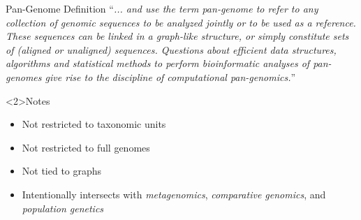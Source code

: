 \documentclass[notes=hide]{beamer}
\newcommand{\0}{\ensuremath{\mathtt{0}}}
\newcommand{\1}{\ensuremath{\mathtt{1}}}
\begin{document}
\begin{frame}{Pan-Genome Definition}
``\textit{... and use the term \emph{pan-genome} to refer to any collection of genomic sequences to be analyzed jointly or to be used as a reference.
These sequences can be linked in a graph-like structure, or simply constitute sets of (aligned or unaligned) sequences.
Questions about efficient data structures, algorithms and statistical methods to perform bioinformatic analyses of pan-genomes give rise to the discipline of \emph{computational pan-genomics}.}''
\begin{block}<2>{Notes}
\begin{itemize}
 \item Not restricted to taxonomic units
 \item Not restricted to full genomes
 \item Not tied to graphs
 \item Intentionally intersects with \emph{metagenomics}, \emph{comparative genomics}, and \emph{population genetics}
\end{itemize}
\end{block}
\end{frame}

\end{document}
